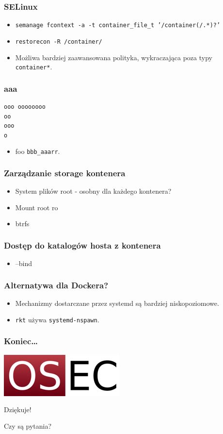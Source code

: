 \documentclass[dvipsnames,table]{beamer}
\begin{document}
\begin{frame}
\frametitle{SELinux}
\begin{itemize}
	\item {\tt semanage fcontext -a -t container\_file\_t '/container(/.*)?'}
	\item {\tt restorecon -R /container/}
	\item Możliwa bardziej zaawansowana polityka, wykraczająca poza typy {\tt container*}.
\end{itemize}	
\end{frame}


\begin{frame}[fragile]
\frametitle{aaa}
\scriptsize
\begin{verbatim}
ooo oooooooo
oo
ooo
o
\end{verbatim}
\normalsize
\begin{itemize}
	\item foo {\tt bbb\_aaarr}.
\end{itemize}

\end{frame}

\begin{frame}
	\frametitle{Zarządzanie storage kontenera}
	\begin{itemize}
		\item System plików root - osobny dla każdego kontenera?
		\item Mount root ro
		\item btrfs
	\end{itemize}
\end{frame}

\begin{frame}
	\frametitle{Dostęp do katalogów hosta z kontenera}
	\begin{itemize}
		\item --bind
	\end{itemize}
\end{frame}

\begin{frame}
\frametitle{Alternatywa dla Dockera?}
\begin{itemize}
	\item Mechanizmy dostarczane przez systemd są bardziej niskopoziomowe.
	\item {\tt rkt} używa {\tt systemd-nspawn}.
\end{itemize}	
\end{frame}
\begin{frame}

\frametitle{Koniec\ldots}
\begin{center}
\includegraphics[scale=0.5]{img-oseclogo.png}

Dziękuje!

Czy są pytania?

\end{center}

\end{frame}
 
\end{document}

